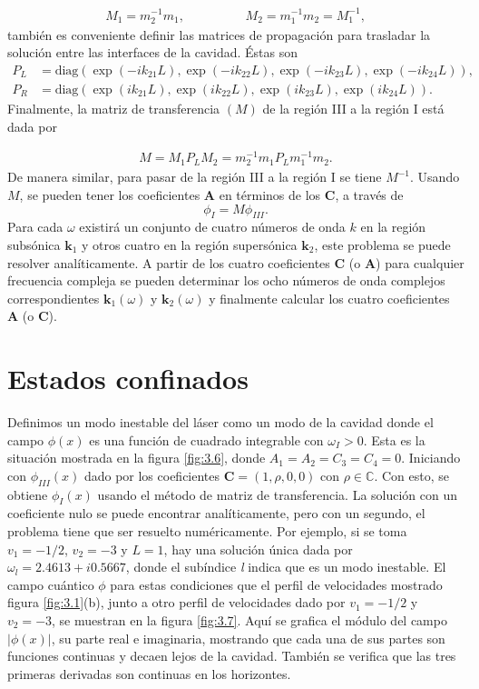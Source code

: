 \begin{align}
M_1=m_2^{-1} m_1, \hspace{2cm}M_2=m_1^{-1} m_2=M_1^{-1},
\end{align}
también es conveniente definir las matrices de propagación para trasladar la solución entre las interfaces de la cavidad. \'{E}stas son
\begin{align}
\nonumber P_L&=\text{diag}(\exp(-ik_{21}L),\exp(-ik_{22}L),\exp(-ik_{23}L),\exp(-ik_{24}L)),\\
P_R&=\text{diag}(\exp(ik_{21}L),\exp(ik_{22}L),\exp
(ik_{23}L),\exp(ik_{24}L)).
\end{align}
Finalmente, la matriz de transferencia $(M)$ de la regi\'{o}n III a la regi\'{o}n I est\'a dada por

\begin{align}\label{matrizM}
M=M_1P_LM_2=m_2^{-1}m_1P_Lm_1^{-1}m_2.
\end{align}
De manera similar, para pasar de la regi\'{o}n III a la regi\'{o}n I se tiene $M^{-1}$. Usando $M$, se pueden tener los coeficientes $\textbf{A}$ en t\'{e}rminos de los $\textbf{C}$, a trav\'{e}s de
\begin{equation}
\phi_I=M\phi_{III}.
\end{equation} 
Para cada $\omega$ existir\'{a} un conjunto de cuatro n\'{u}meros de onda $k$ en la regi\'{o}n subs\'{o}nica $\textbf{k}_1$ y otros cuatro en la regi\'{o}n supers\'{o}nica $\textbf{k}_2$, este problema se puede resolver analíticamente. A partir de los cuatro coeficientes $\textbf{C}$ (o$\textbf{ A}$) para cualquier frecuencia compleja se pueden determinar los ocho números de onda complejos correspondientes
$\textbf{k}_1(\omega)$ y $\textbf{k}_2(\omega)$ y finalmente calcular los cuatro coeficientes\textbf{ A} (o \textbf{C}). 
\section{Estados confinados}\label{sec:comp}
Definimos un modo inestable del láser  como un modo de la cavidad donde el campo $\phi(x)$ es una funci\'{o}n de cuadrado integrable con $\omega_I>0$. Esta es la situación mostrada en la figura \ref{fig:3.6}, donde $A_1 = A_2 = C_3 = C_4 = 0$. Iniciando con $\phi_{III}(x)$ dado por los coeficientes $\textbf{C} = (1,\rho, 0, 0)$ con $\rho \in \mathbb{C}$. Con esto, se obtiene $\phi_I(x)$ usando el método de matriz de transferencia. La solución con un coeficiente nulo se puede encontrar analíticamente, pero con un segundo, el problema tiene que ser resuelto numéricamente. Por ejemplo, si se toma $v_1 =-1 / 2$, $v_2=-3$ y $L=1$, hay una solución única dada por $\omega_l= 2.4613 + i0.5667$, donde el subíndice \textit{l} indica que es un modo inestable. El campo cuántico $\phi$ para estas condiciones que el  perfil de velocidades mostrado figura \ref{fig:3.1}(b), junto a otro perfil de velocidades dado por $v_1=-1/2$ y $v_2=-3$, se muestran en la figura \ref{fig:3.7}. Aqu\'{i} se grafica el m\'odulo del campo $|\phi(x)|$, su  parte real e imaginaria, mostrando que cada una de sus partes son funciones continuas y decaen lejos de la cavidad. También se verifica que las tres primeras derivadas son continuas en los horizontes.\\

